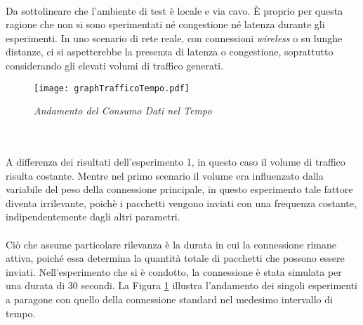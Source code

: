 \\
\noindent Da sottolineare che l'ambiente di test è locale e via cavo. È proprio per questa ragione che non si sono sperimentati né congestione né latenza durante gli esperimenti. 
In uno scenario di rete reale, con connessioni \emph{wireless} o su lunghe distanze, ci si aspetterebbe la presenza di latenza o congestione, soprattutto considerando gli elevati volumi di traffico generati. 
\begin{figure}[!h]
    \centering
        \texttt{[image: graphTrafficoTempo.pdf]}
        \caption{\emph{Andamento del Consumo Dati nel Tempo}}
        \label{grafico23}
\end{figure}
\\\\
\noindent A differenza dei risultati dell'esperimento 1, in questo caso il volume di traffico risulta costante.
Mentre nel primo scenario il volume era influenzato dalla variabile del peso della connessione principale, in questo esperimento tale fattore diventa irrilevante,
poichè i pacchetti vengono inviati con una frequenza costante, indipendentemente dagli altri parametri.
\\\\
Ciò che assume particolare rilevanza è la durata in cui la connessione rimane attiva, poiché essa determina la quantità totale di pacchetti che possono essere inviati.
Nell'esperimento che si è condotto, la connessione è stata simulata per una durata di 30 secondi. 
La Figura \ref{grafico23} illustra l'andamento dei singoli esperimenti a paragone con quello della connessione standard nel medesimo intervallo di tempo.

